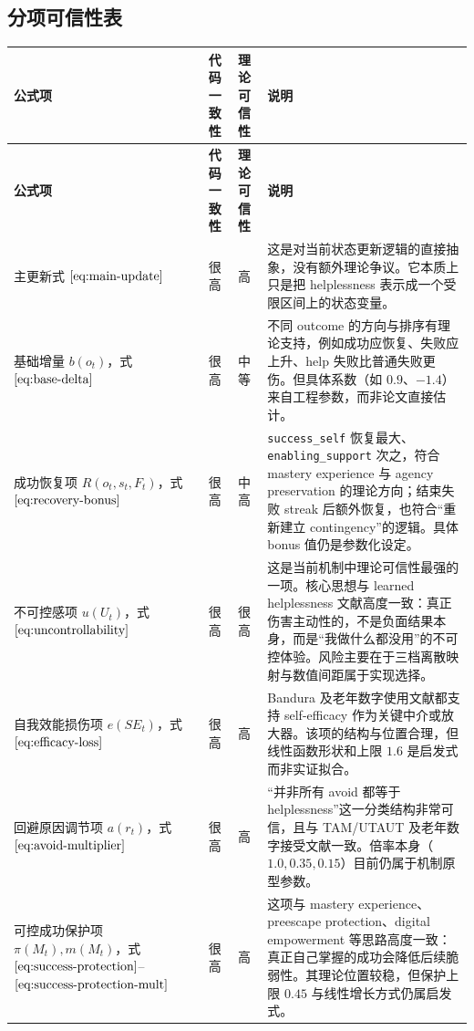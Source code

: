 \documentclass[11pt]{article}
\begin{document}
\subsection{分项可信性表}
\renewcommand{\arraystretch}{1.25}
\begin{longtable}{L{2.8cm}L{1.8cm}L{1.8cm}L{8.0cm}}
\toprule
\textbf{公式项} & \textbf{代码一致性} & \textbf{理论可信性} & \textbf{说明} \\
\midrule
\endfirsthead
\toprule
\textbf{公式项} & \textbf{代码一致性} & \textbf{理论可信性} & \textbf{说明} \\
\midrule
\endhead
\bottomrule
\endfoot

主更新式 $\eqref{eq:main-update}$ & 很高 & 高 &
这是对当前状态更新逻辑的直接抽象，没有额外理论争议。它本质上只是把 helplessness 表示成一个受限区间上的状态变量。 \\

基础增量 $b(o_t)$，式 $\eqref{eq:base-delta}$ & 很高 & 中等 &
不同 outcome 的方向与排序有理论支持，例如成功应恢复、失败应上升、help 失败比普通失败更伤。但具体系数（如 $0.9$、$-1.4$）来自工程参数，而非论文直接估计。 \\

成功恢复项 $R(o_t,s_t,F_t)$，式 $\eqref{eq:recovery-bonus}$ & 很高 & 中高 &
\texttt{success\_self} 恢复最大、\texttt{enabling\_support} 次之，符合 mastery experience 与 agency preservation 的理论方向；结束失败 streak 后额外恢复，也符合“重新建立 contingency”的逻辑。具体 bonus 值仍是参数化设定。 \\

不可控感项 $u(U_t)$，式 $\eqref{eq:uncontrollability}$ & 很高 & 很高 &
这是当前机制中理论可信性最强的一项。核心思想与 learned helplessness 文献高度一致：真正伤害主动性的，不是负面结果本身，而是“我做什么都没用”的不可控体验。风险主要在于三档离散映射与数值间距属于实现选择。 \\

自我效能损伤项 $e(SE_t)$，式 $\eqref{eq:efficacy-loss}$ & 很高 & 高 &
Bandura 及老年数字使用文献都支持 self-efficacy 作为关键中介或放大器。该项的结构与位置合理，但线性函数形状和上限 $1.6$ 是启发式而非实证拟合。 \\

回避原因调节项 $a(r_t)$，式 $\eqref{eq:avoid-multiplier}$ & 很高 & 高 &
“并非所有 avoid 都等于 helplessness”这一分类结构非常可信，且与 TAM/UTAUT 及老年数字接受文献一致。倍率本身（$1.0,0.35,0.15$）目前仍属于机制原型参数。 \\

可控成功保护项 $\pi(M_t),m(M_t)$，式 $\eqref{eq:success-protection}$--$\eqref{eq:success-protection-mult}$ & 很高 & 高 &
这项与 mastery experience、preescape protection、digital empowerment 等思路高度一致：真正自己掌握的成功会降低后续脆弱性。其理论位置较稳，但保护上限 $0.45$ 与线性增长方式仍属启发式。 \\


\end{longtable}
\end{document}
